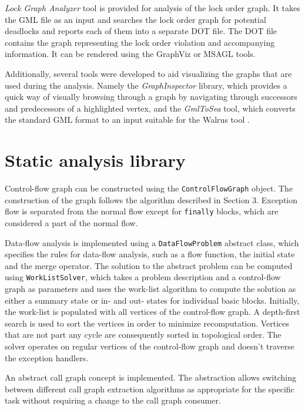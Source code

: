 \emph{Lock Graph Analyzer} tool is provided for analysis of the lock order graph. It takes the GML file as an input and searches the lock order graph for potential deadlocks and reports each of them into a separate DOT file. The DOT file contains the graph representing the lock order violation and accompanying information. It can be rendered using the GraphViz \citep{GraphViz} or MSAGL \citep{MsAgl} tools.

Additionally, several tools were developed to aid visualizing the graphs that are used during the analysis. Namely the \emph{GraphInspector} library, which provides a quick way of visually browsing through a graph by navigating through successors and predecessors of a highlighted vertex, and the \emph{GmlToSea} tool, which converts the standard GML format to an input suitable for the Walrus tool \citep{Walrus}.

\section{Static analysis library}

Control-flow graph can be constructed using the \texttt{ControlFlowGraph} object. The construction of the graph follows the algorithm described in Section 3. Exception flow is separated from the normal flow except for \texttt{finally} blocks, which are considered a part of the normal flow.

Data-flow analysis is implemented using a \texttt{DataFlowProblem} abstract class, which specifies the rules for data-flow analysis, such as a flow function, the initial state and the merge operator. The solution to the abstract problem can be computed using \texttt{WorkListSolver}, which takes a problem description and a control-flow graph as parameters and uses the work-list algorithm to compute the solution as either a summary state or in- and out- states for individual basic blocks. Initially, the work-list is populated with all vertices of the control-flow graph. A depth-first search is used to sort the vertices in order to minimize recomputation. Vertices that are not part any cycle are consequently sorted in topological order. The solver operates on regular vertices of the control-flow graph and doesn't traverse the exception handlers.

An abstract call graph concept is implemented. The abstraction allows switching between different call graph extraction algorithms as appropriate for the specific task without requiring a change to the call graph consumer.


